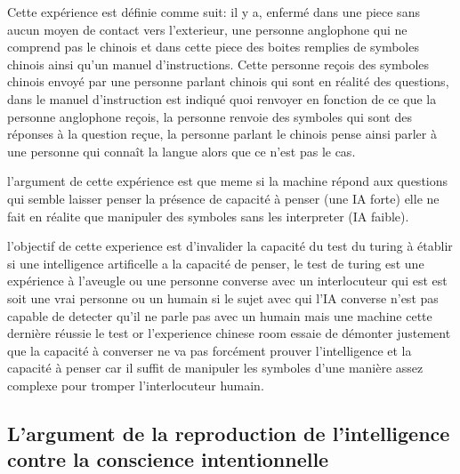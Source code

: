 Cette expérience est définie comme suit: \newline
il y a, enfermé dans une piece sans aucun moyen de contact vers l'exterieur, une personne anglophone qui ne comprend 
pas le chinois et dans cette piece des boites remplies de symboles chinois ainsi qu'un manuel d'instructions.
Cette personne reçois des symboles chinois envoyé par une personne parlant chinois qui sont en réalité des questions,
dans le manuel d'instruction est indiqué quoi renvoyer en fonction de ce que la personne anglophone reçois,
la personne renvoie des symboles qui sont des réponses à la question reçue, la personne parlant le chinois
pense ainsi parler à une personne qui connaît la langue alors que ce n'est pas le cas. \newline 

l'argument de cette expérience est que meme si la machine répond aux questions qui semble laisser penser 
la présence de capacité à penser (une IA forte) elle ne fait en réalite que manipuler des symboles 
sans les interpreter (IA faible). \newline

l'objectif de cette experience est d'invalider la capacité du test du turing à établir si une 
intelligence artificelle a la capacité de penser, le test de turing est une expérience à l'aveugle 
ou une personne converse avec un interlocuteur qui est est soit une vrai personne ou un humain 
si le sujet avec qui l'IA converse n'est pas capable de detecter qu'il ne parle pas avec un humain mais
une machine cette dernière réussie le test or l'experience chinese room essaie de démonter 
justement que la capacité à converser ne va pas forcément prouver l'intelligence et la capacité à penser  
car il suffit de manipuler les symboles d'une manière assez complexe pour tromper l'interlocuteur humain.


\subsection{L'argument de la reproduction de l'intelligence contre la conscience intentionnelle}


%

